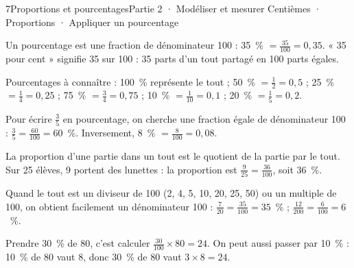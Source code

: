\begin{ouverture}[statistiques]{7}{Proportions et pourcentages}{Partie 2 · Modéliser et mesurer}
{Centièmes · Proportions · Appliquer un pourcentage}
\end{ouverture}
\pagestyle{otMain}\essentiel\fontsize{11}{15}\selectfont
{}\label{cours-7-1}
\begin{definition}Un pourcentage est une fraction de dénominateur 100 : 35~\% $=\frac{35}{100}=0{,}35$. « 35 pour cent » signifie 35 sur 100 : 35 parts d’un tout partagé en 100 parts égales.\end{definition}
\label{fig-cours-7-1-cours-grille-100}

\begin{propriete}Pourcentages à connaître : 100~\% représente le tout ; 50~\% $=\frac12=0{,}5$ ; 25~\% $=\frac14=0{,}25$ ; 75~\% $=\frac34=0{,}75$ ; 10~\% $=\frac1{10}=0{,}1$ ; 20~\% $=\frac15=0{,}2$.\end{propriete}
\begin{savoirfaire}Pour écrire $\frac35$ en pourcentage, on cherche une fraction égale de dénominateur 100 : $\frac35=\frac{60}{100}=60$~\%. Inversement, 8~\% $=\frac8{100}=0{,}08$.\end{savoirfaire}
\clearpage
{}\label{cours-7-2}
\begin{definition}La proportion d’une partie dans un tout est le quotient de la partie par le tout. Sur 25 élèves, 9 portent des lunettes : la proportion est $\frac9{25}=\frac{36}{100}$, soit 36~\%.\end{definition}
\begin{savoirfaire}Quand le tout est un diviseur de 100 (2, 4, 5, 10, 20, 25, 50) ou un multiple de 100, on obtient facilement un dénominateur 100 : $\frac7{20}=\frac{35}{100}=35$~\% ; $\frac{12}{200}=\frac6{100}=6$~\%.\end{savoirfaire}
\begin{savoirfaire}Prendre 30~\% de 80, c’est calculer $\frac{30}{100}\times80=24$. On peut aussi passer par 10~\% : 10~\% de 80 vaut 8, donc 30~\% de 80 vaut $3\times8=24$.\end{savoirfaire}
\label{fig-cours-7-2-cours-bande-pct}

